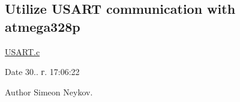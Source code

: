\subsection*{Utilize U\+S\+A\+RT communication with atmega328p}

\mbox{\hyperlink{_u_s_a_r_t_8c}{U\+S\+A\+R\+T.\+c}}

\begin{DoxyDate}{Date}
30.. г. 17\+:06\+:22 
\end{DoxyDate}
\begin{DoxyAuthor}{Author}
Simeon Neykov. 
\end{DoxyAuthor}
